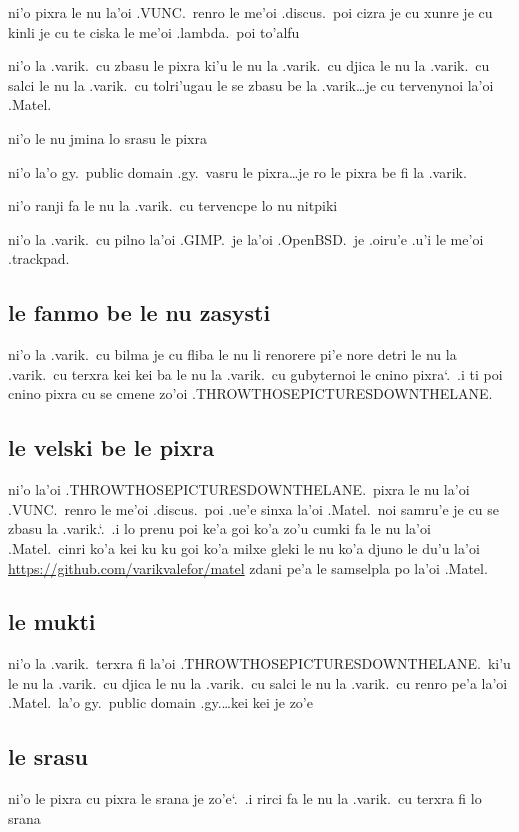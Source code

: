 \documentclass{report}
\newcommand\sds{\spacefactor\sfcode`.\ \space}
\begin{document}
ni'o pixra le nu la'oi .VUNC.\ renro le me'oi .discus.\ poi cizra je cu xunre je cu kinli je cu te ciska le me'oi .lambda.\ poi to'alfu

ni'o la .varik.\ cu zbasu le pixra ki'u le nu la .varik.\ cu djica le nu la .varik.\ cu salci le nu la .varik.\ cu tolri'ugau le se zbasu be la .varik\ldots je cu tervenynoi la'oi .Matel.

ni'o le nu jmina lo srasu le pixra

ni'o la'o gy.\ public domain .gy.\ vasru le pixra\ldots je ro le pixra be fi la .varik.

ni'o ranji fa le nu la .varik.\ cu tervencpe lo nu nitpiki

ni'o la .varik.\ cu pilno la'oi .GIMP.\ je la'oi .OpenBSD.\ je .oiru'e .u'i le me'oi .trackpad.

\subsection{le fanmo be le nu zasysti}
ni'o la .varik.\ cu bilma je cu fliba le nu li renorere pi'e nore detri le nu la .varik.\ cu terxra kei kei ba le nu la .varik.\ cu gubyternoi le cnino pixra\sds  .i ti poi cnino pixra cu se cmene zo'oi .THROWTHOSEPICTURESDOWNTHELANE.

\subsection{le velski be le pixra}
ni'o la'oi .THROWTHOSEPICTURESDOWNTHELANE.\ pixra le nu la'oi \linebreak  %
.VUNC.\ renro le me'oi .discus.\ poi .ue'e sinxa la'oi .Matel.\ noi samru'e je cu se zbasu la .varik.\sds  .i lo prenu poi ke'a goi ko'a zo'u cumki fa le nu la'oi .Matel.\ cinri ko'a kei ku ku goi ko'a milxe gleki le nu ko'a djuno le du'u la'oi \url{https://github.com/varikvalefor/matel} zdani pe'a le samselpla po la'oi .Matel.

\subsection{le mukti}
ni'o la .varik.\ terxra fi la'oi .THROWTHOSEPICTURESDOWNTHELANE.\ ki'u le nu la .varik.\ cu djica le nu la .varik.\ cu salci le nu la .varik.\ cu renro pe'a la'oi .Matel.\ la'o gy.\ public domain .gy.\ldots kei kei je zo'e

\subsection{le srasu}
ni'o le pixra cu pixra le srana je zo'e\sds  .i rirci fa le nu la .varik.\ cu terxra fi lo srana
\end{document}
